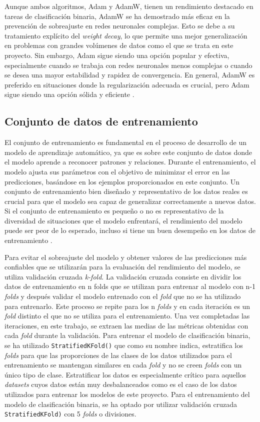 Aunque ambos algoritmos, Adam y AdamW, tienen un rendimiento destacado en tareas de clasificación binaria, AdamW se ha demostrado más eficaz en la prevención de sobreajuste en redes neuronales complejas. Esto se debe a su tratamiento explícito del \textit{weight decay}, lo que permite una mejor generalización en problemas con grandes volúmenes de datos como el que se trata en este proyecto. Sin embargo, Adam sigue siendo una opción popular y efectiva, especialmente cuando se trabaja con redes neuronales menos complejas o cuando se desea una mayor estabilidad y rapidez de convergencia. En general, AdamW es preferido en situaciones donde la regularización adecuada es crucial, pero Adam sigue siendo una opción sólida y eficiente \cite{kingma2014adam}.

\subsection{Conjunto de datos de entrenamiento} \label{subsec:conjdatent}
El conjunto de entrenamiento es fundamental en el proceso de desarrollo de un modelo de aprendizaje automático, ya que es sobre este conjunto de datos donde el modelo aprende a reconocer patrones y relaciones. Durante el entrenamiento, el modelo ajusta sus parámetros con el objetivo de minimizar el error en las predicciones, basándose en los ejemplos proporcionados en este conjunto. Un conjunto de entrenamiento bien diseñado y representativo de los datos reales es crucial para que el modelo sea capaz de generalizar correctamente a nuevos datos. Si el conjunto de entrenamiento es pequeño o no es representativo de la diversidad de situaciones que el modelo enfrentará, el rendimiento del modelo puede ser peor de lo esperado, incluso si tiene un buen desempeño en los datos de entrenamiento  \cite{bishop2006pattern}.

Para evitar el sobreajuste del modelo y obtener valores de las predicciones más confiables que se utilizarán para la evaluación del rendimiento del modelo, se utiliza validación cruzada \textit{k-fold}. La validación cruzada consiste en dividir los datos de entrenamiento en n folds que se utilizan para entrenar al modelo con n-1 \textit{folds} y después validar el modelo entrenado con el \textit{fold} que no se ha utilizado para entrenarlo. Este proceso se repite para los n \textit{folds} y en cada iteración es un \textit{fold} distinto el que no se utiliza para el entrenamiento. Una vez completadas las iteraciones, en este trabajo, se extraen las medias de las métricas obtenidas con cada \textit{fold} durante la validación. Para entrenar el modelo de clasificación binaria, se ha utilizado \texttt{StratifiedKFold()} que como su nombre indica, estratifica los \textit{folds} para que las proporciones de las clases de los datos utilizados para el entrenamiento se mantengan similares en cada \textit{fold} y no se creen \textit{folds} con un único tipo de clase. Estratificar los datos es especialmente crítico para aquellos \textit{datasets} cuyos datos están muy desbalanceados como es el caso de los datos utilizados para entrenar los modelos de este proyecto. Para el entrenamiento del modelo de clasificación binaria, se ha optado por utilizar validación cruzada \texttt{StratifiedKFold)} con 5 \textit{folds} o divisiones.


